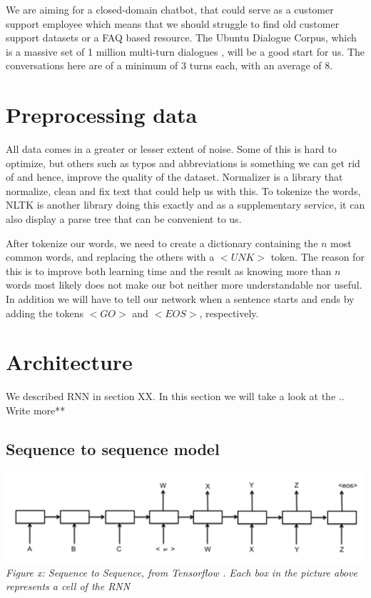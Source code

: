 \documentclass{article} %
\begin{document}
We are aiming for a closed-domain chatbot, that could serve as a customer support employee which means that we should struggle to find old customer support datasets or a FAQ based resource. The Ubuntu Dialogue Corpus, which is a massive set of 1 million multi-turn dialogues \cite{Lowe}, will be a good start for us. The conversations here are of a minimum of 3 turns each, with an average of 8. %

\section{Preprocessing data}
All data comes in a greater or lesser extent of noise. Some of this is hard to optimize, but others such as typos and abbreviations is something we can get rid of and hence, improve the quality of the dataset. Normalizer \cite{Normalizer} is a library that normalize, clean and fix text that could help us with this. To tokenize the words, NLTK \cite{NLTK} is another library doing this exactly and as a supplementary service, it can also display a parse tree that can be convenient to us.

After tokenize our words, we need to create a dictionary containing the $n$ most common words, and replacing the others with a $<UNK>$ token. The reason for this is to improve both learning time and the result as knowing more than $n$ words most likely does not make our bot neither more understandable nor useful. In addition we will have to tell our network when a sentence starts and ends by adding the tokens $<GO>$ and $<EOS>$, respectively.

\section{Architecture}
We described RNN in section XX. In this section we will take a look at the .. Write more**

\subsection{Sequence to sequence model}
\includegraphics[scale=0.5]{seq2seq} \newline
\textit{Figure x: Sequence to Sequence, from Tensorflow \cite{seq2seq}. Each box in the picture above represents a cell of the RNN } \newline
\end{document}
